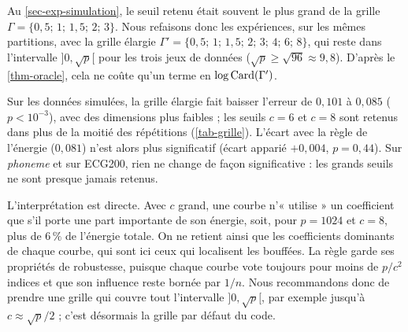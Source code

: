 Au \cref{sec-exp-simulation}, le seuil retenu était souvent le plus grand de la grille $\Gamma=\{0{,}5;\,1;\,1{,}5;\,2;\,3\}$. Nous refaisons donc les expériences, sur les mêmes partitions, avec la grille élargie $\Gamma'=\{0{,}5;\,1;\,1{,}5;\,2;\,3;\,4;\,6;\,8\}$, qui reste dans l'intervalle $]0,\sqrt p[$ pour les trois jeux de données ($\sqrt p\ge\sqrt{96}\approx9{,}8$). D'après le \cref{thm-oracle}, cela ne coûte qu'un terme en $\log\operatorname{Card}(\Gamma')$.

\begin{table}[ht]
\centering
\small

\caption{Règle d'usage avec la grille par défaut et avec la grille élargie (\texttt{db4}, sélection conjointe, $100$ répétitions appariées). La $p$-valeur compare les deux grilles.}
\label{tab-grille}
\end{table}

Sur les données simulées, la grille élargie fait baisser l'erreur de $0{,}101$ à $0{,}085$ ($p<10^{-3}$), avec des dimensions plus faibles ; les seuils $c=6$ et $c=8$ sont retenus dans plus de la moitié des répétitions (\cref{tab-grille}). L'écart avec la règle de l'énergie ($0{,}081$) n'est alors plus significatif (écart apparié $+0{,}004$, $p=0{,}44$). Sur \emph{phoneme} et sur ECG200, rien ne change de façon significative : les grands seuils ne sont presque jamais retenus.

L'interprétation est directe. Avec $c$ grand, une courbe n'« utilise » un coefficient que s'il porte une part importante de son énergie, soit, pour $p=1024$ et $c=8$, plus de $6\,\%$ de l'énergie totale. On ne retient ainsi que les coefficients dominants de chaque courbe, qui sont ici ceux qui localisent les bouffées. La règle garde ses propriétés de robustesse, puisque chaque courbe vote toujours pour moins de $p/c^2$ indices et que son influence reste bornée par $1/n$. Nous recommandons donc de prendre une grille qui couvre tout l'intervalle $]0,\sqrt p[$, par exemple jusqu'à $c\approx\sqrt p/2$ ; c'est désormais la grille par défaut du code.
